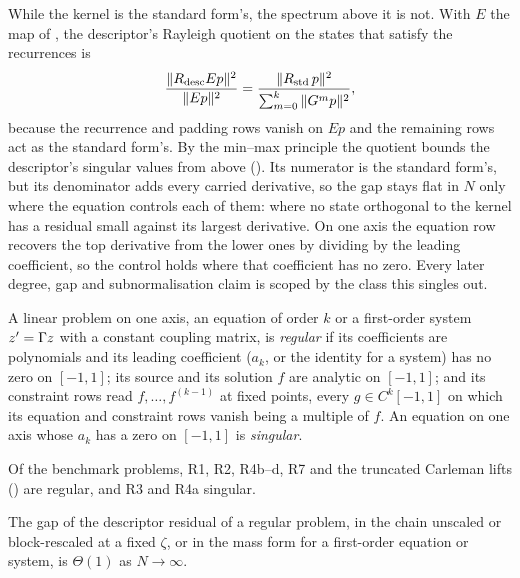 While the kernel is the standard form's, the spectrum above it is not. With $E$ the map of , the descriptor's Rayleigh quotient on the states that satisfy the recurrences is
\begin{equation}
    \frac{\|R_{\mathrm{desc}}Ep\|^2}{\|Ep\|^2}
    = \frac{\|R_{\mathrm{std}}\,p\|^2}{\sum_{m=0}^{k}\|G^{m}p\|^2},
    \label{eq:descriptor-quotient}
\end{equation}
because the recurrence and padding rows vanish on $Ep$ and the remaining rows act as the standard form's. By the min--max principle the quotient bounds the descriptor's singular values from above (). Its numerator is the standard form's, but its denominator adds every carried derivative, so the gap stays flat in $N$ only where the equation controls each of them: where no state orthogonal to the kernel has a residual small against its largest derivative. On one axis the equation row recovers the top derivative from the lower ones by dividing by the leading coefficient, so the control holds where that coefficient has no zero. Every later degree, gap and subnormalisation claim is scoped by the class this singles out.
\begin{definition}
\label{def:regular}
A linear problem on one axis, an equation of order $k$ or a first-order system $z'=\Gamma z$ with a constant coupling matrix, is \emph{regular} if its coefficients are polynomials and its leading coefficient ($a_k$, or the identity for a system) has no zero on $[-1,1]$; its source and its solution $f$ are analytic on $[-1,1]$; and its constraint rows read $f,\dots,f^{(k-1)}$ at fixed points, every $g\in C^k[-1,1]$ on which its equation and constraint rows vanish being a multiple of $f$. An equation on one axis whose $a_k$ has a zero on $[-1,1]$ is \emph{singular}.
\end{definition}
Of the benchmark problems, R1, R2, R4b--d, R7 and the truncated Carleman lifts () are regular, and R3 and R4a singular.
\begin{theorem}
\label{thm:flat-gap}
The gap of the descriptor residual of a regular problem, in the chain unscaled or block-rescaled at a fixed $\zeta$, or in the mass form for a first-order equation or system, is $\Theta(1)$ as $N\to\infty$.
\end{theorem}
